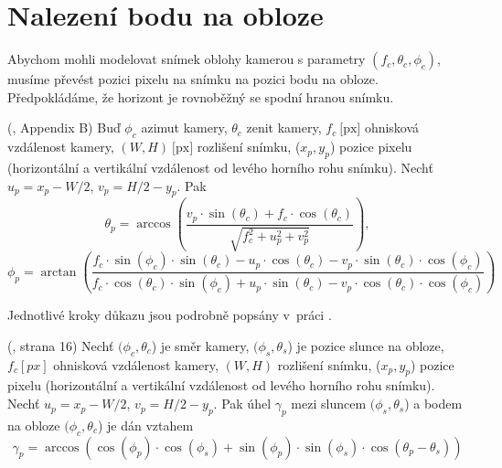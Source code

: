 \section{Nalezení bodu na obloze}
Abychom mohli modelovat snímek oblohy kamerou s parametry $(f_c, \theta_c, \phi_c)$, musíme převést pozici pixelu na snímku na pozici bodu na obloze. Předpokládáme, že horizont je rovnoběžný se spodní hranou snímku.

\begin{lemma}\label{lemma01:2}(\citealp{Lalonde10}, Appendix B)
  Buď  $\phi_c$ azimut kamery, $\theta_c$ zenit kamery, $f_c~\text{[px]}$ ohnisková vzdálenost kamery, $(W, H)~\text{[px]}$ rozlišení snímku, ($x_p, y_p$) pozice pixelu (horizontální a vertikální vzdálenost od levého horního rohu snímku). Nechť $u_p = x_p - W/2$, $v_p = H/2 - y_p$. Pak
  \begin{equation}\label{eq01:2}
    \theta_p=\arccos \left( \frac{v_p \cdot \sin(\theta_c) + f_c \cdot \cos(\theta_c)}{\sqrt{f_c^2 + u_p^2 + v_p^2}} \right),
  \end{equation}
  \begin{equation}\label{eq01:3}
    \phi_p=\arctan \left( \frac{f_c \cdot \sin(\phi_c) \cdot \sin(\theta_c) - u_p \cdot \cos(\theta_c) - v_p \cdot \sin(\theta_c) \cdot \cos(\phi_c)}{f_c \cdot \cos(\theta_c) \cdot \sin(\phi_c) + u_p \cdot \sin(\theta_c) - v_p \cdot \cos(\theta_c) \cdot \cos(\phi_c)} \right)
  \end{equation}
\end{lemma}
\begin{dukaz}
  Jednotlivé kroky důkazu jsou podrobně popsány v~práci \citet[Appendix B]{Lalonde10}.
\end{dukaz}
  
\begin{lemma}\label{lemma01:3}(\citealp{Lalonde10}, strana 16)
  Nechť $(\phi_c, \theta_c$) je směr kamery, $(\phi_s, \theta_s$) je pozice slunce na obloze, $f_c[px]$ ohnisková vzdálenost kamery, $(W, H)$ rozlišení snímku, ($x_p, y_p$) pozice pixelu (horizontální a vertikální vzdálenost od levého horního rohu snímku). Nechť $u_p = x_p - W/2$, $v_p = H/2 - y_p$. Pak úhel $\gamma_p$ mezi sluncem $(\phi_s, \theta_s$) a bodem na obloze $(\phi_c, \theta_c$) je dán vztahem
  \begin{equation}\label{eq01:4}
    \gamma_p = \arccos \left( \cos(\phi_p) \cdot \cos(\phi_s) + \sin(\phi_p) \cdot \sin(\phi_s) \cdot \cos(\theta_p - \theta_s) \right)
  \end{equation}
\end{lemma}

